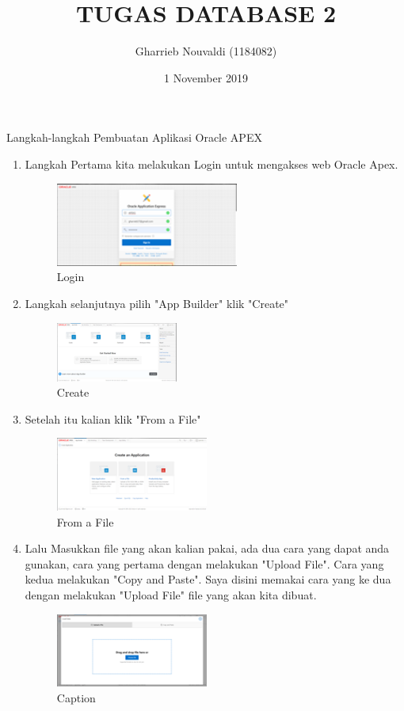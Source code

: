 \documentclass{article}
\title{TUGAS DATABASE 2}
\author{Gharrieb Nouvaldi (1184082) }
\date{1 November 2019}
\begin{document}
\maketitle

\par
Langkah-langkah Pembuatan Aplikasi Oracle APEX
\begin{enumerate}
    \item Langkah Pertama kita melakukan Login untuk mengakses web Oracle Apex.
    \begin{figure}[h]
	\centering
	\includegraphics[width=6cm]{Figure/Login.png}
	\caption{Login}
	\label{fig:gambar}
	\end{figure}

    \item Langkah selanjutnya pilih "App Builder"  klik "Create"
    \begin{figure}[h]
	\centering
	\includegraphics[width=4cm]{Figure/Create.png}
	\caption{Create}
	\label{fig:gambar}
	\end{figure}

    \item Setelah itu kalian klik "From a File"
    \begin{figure}[h]
	\centering
	\includegraphics[width=5cm]{Figure/FOF.png}
	\caption{From a File}
	\label{fig:gambar}
	\end{figure}

    \item Lalu Masukkan file yang akan kalian pakai, ada dua cara yang dapat anda gunakan, cara yang pertama dengan melakukan "Upload File". Cara yang kedua melakukan "Copy and Paste". Saya disini memakai cara yang ke dua dengan melakukan "Upload File" file yang akan kita dibuat.
     \begin{figure}[!htbp]
        \centering
        \includegraphics [width=5cm]{Figure/CF.png}
        \caption{Caption}
        \label{capture3}
    \end{figure}
    

\end{enumerate}
\end{document}
